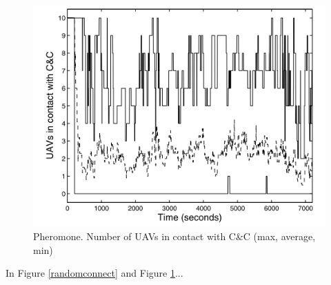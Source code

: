 \begin{figure}[h]
\caption{\label{pheromoneconnect}Pheromone. Number of UAVs in contact with C\&C (max, average, min)}
   \includegraphics{../images/pheromone_resultat_connectivite.png}
\end{figure}
In Figure \ref{randomconnect} and Figure \ref{pheromoneconnect}...